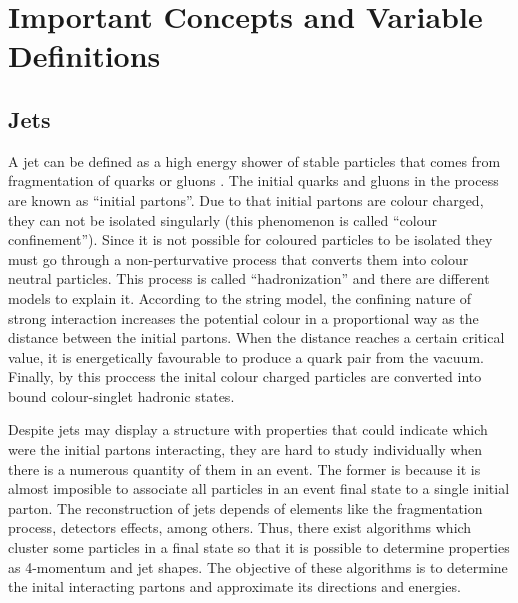  \chapter{Important Concepts and Variable Definitions}
 \label{Important_concepts_chapter}
 
 \section{Jets}
 A jet can be defined as a high energy shower of stable particles that comes from fragmentation of quarks or gluons \cite{Particle_Detectors_Claus}. The initial quarks and gluons in the process are known as ``initial partons''. Due to that initial partons are colour charged, they can not be isolated singularly (this phenomenon is called ``colour confinement''). Since it is not possible for coloured particles to be isolated they must go through a non-perturvative process that converts them into colour neutral particles. This process is called ``hadronization'' and there are different models to explain it. According to the string model, the confining nature of strong interaction increases the potential colour in a proportional way as the distance between the initial partons. When the distance reaches a certain critical value, it is energetically favourable to produce a quark pair from the vacuum. Finally, by this proccess the inital colour charged particles are converted into bound colour-singlet hadronic states.  
 
 Despite jets may display a structure with properties that could indicate which were the initial partons interacting, they are hard to study individually when there is a numerous quantity of them
 in an event. The former is because it is almost imposible to associate all particles in an event final state to a single initial parton. The reconstruction of jets depends of elements like the 
 fragmentation process, detectors effects, among others. Thus, there exist algorithms which cluster some particles in a final state so that it is possible to determine properties as 4-momentum 
 and jet shapes. The objective of these algorithms is to determine the inital interacting partons and approximate its directions and energies.

